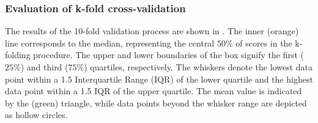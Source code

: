 \subsubsection{Evaluation of k-fold cross-validation}\label{sec:bbm_kfold_perf_eval}

The results of the 10-fold validation process are shown in . The inner (orange) line corresponds to the median, representing the central $50\%$ of scores in the k-folding procedure. The upper and lower boundaries of the box signify the first ($25\%$) and third ($75\%$) quartiles, respectively. The whiskers denote the lowest data point within a 1.5 Interquartile Range (IQR) of the lower quartile and the highest data point within a 1.5 IQR of the upper quartile. The mean value is indicated by the (green) triangle, while data points beyond the whisker range are depicted as hollow circles.\\

